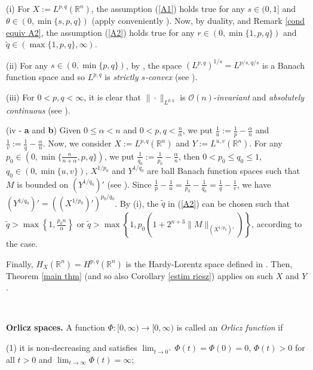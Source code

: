 \documentclass[oneside,10pt]{article}
\begin{document}
(i) For $X:= L^{p, q}(\mathbb{R}^n)$, the assumption (\ref{A1}) holds true for any $s \in (0,1]$ and $\theta \in (0, \min\{ s, p, q \})$ 
(apply conveniently \cite[Theorem 2.3 (iii)]{Curbera}). Now, by duality, \cite[Theorem 2.3 (iii)]{Curbera} and Remark \ref{cond equiv A2}, 
the assumption (\ref{A2}) holds true for any $r \in (0, \min\{ 1, p, q \})$ and $\widetilde{q} \in (\max \{1, p, q\}, \infty)$.
 
(ii) For any $s \in (0, \min\{p, q \})$, by \cite[Theorem 4.6]{Bennett}, the space $(L^{p, q})^{1/s} = L^{p/s, q/s}$ is a Banach function space and so $L^{p, q}$ is \textit{strictly $s$-convex} (see \cite[Theorem 1.6]{Bennett}).

(iii) For $0 < p, q < \infty$, it is clear that $\| \cdot \|_{L^{p, q}}$ is $\mathcal{O}(n)$-\textit{invariant} and \textit{absolutely continuous} (see \cite[Chapter 4, Section 4]{Bennett}).

(iv - \textbf{a} and \textbf{b}) Given $0 \leq \alpha < n$ and $0 < p, q < \frac{n}{\alpha}$, we put $\frac{1}{u} := \frac{1}{p} - \frac{\alpha}{n}$ and $\frac{1}{v} := \frac{1}{q} - \frac{\alpha}{n}$. Now, we consider $X:= L^{p, q}(\mathbb{R}^n)$ and 
$Y:= L^{u, v}(\mathbb{R}^n)$. For any $p_0 \in (0, \min\{ \frac{n}{n+\alpha}, p, q \})$, we put 
$\frac{1}{q_0}:= \frac{1}{p_0} - \frac{\alpha}{n}$, then $0 < p_0 \leq q_0 \leq 1$, $q_0 \in (0, \min\{u, v\})$, $X^{1/p_0}$ 
and $Y^{1/q_0}$ are ball Banach function spaces such that $M$ is bounded on $(Y^{1/q_0})'$ (see \cite[Theorem 2.3 (i)]{Curbera}). Since  
$\frac{1}{p} - \frac{1}{u}= \frac{1}{p_0} - \frac{1}{q_0}= \frac{1}{q} - \frac{1}{v}$, we have $(Y^{1/q_0})' = ((X^{1/p_0})')^{p_0/q_0}$.
By (i), the $\widetilde{q}$ in (\ref{A2}) can be chosen such that $\widetilde{q} > \max \left\{1, \frac{p_0 n}{\alpha} \right\}$ or
$\widetilde{q} > \max \left\{1, p_0 \left(1+2^{n+3} \| M \|_{(X^{1/p_0})'} \right) \right\}$, according to the case. 

Finally, $H_X (\mathbb{R}^n) = H^{p, q}(\mathbb{R}^n)$ is the Hardy-Lorentz space defined in \cite{Abu}. Then, Theorem \ref{main thm} 
(and so also Corollary \ref{estim riesz}) applies on such $X$ and $Y$.

\

{\bf Orlicz spaces.} A function $\Phi : [0, \infty) \to [0, \infty)$ is called an \textit{Orlicz function} if

(1) it is non-decreasing and satisfies $\lim_{t \to 0^{+}} \Phi(t) = \Phi(0) = 0$, $\Phi(t) > 0$ for all $t>0$ and 
$\lim_{t \to \infty} \Phi(t) = \infty$;
\end{document}
